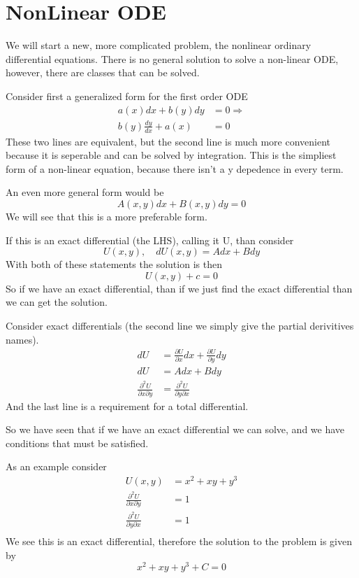 \documentclass{article}
\newcommand{\be}{\begin{equation}}
\newcommand{\ee}{\end{equation}}
\newcommand{\pd}{\partial}
\begin{document}
\section*{NonLinear ODE}
We will start a new, more complicated problem, the nonlinear ordinary differential equations. 
There is no general solution to solve a non-linear ODE, however, there are classes that can be solved. 

Consider first a generalized form for the first order ODE 
\be
\begin{split}
    a(x) dx + b(y) dy &= 0 \Rightarrow\\
    b(y) \frac{dy}{dx} + a(x) &= 0
\end{split}
\ee
These two lines are equivalent, but the second line is much more convenient because it is seperable and can be solved by integration. 
This is the simpliest form of a non-linear equation, because there isn't a y depedence in every term. 

An even more general form would be 
\be
A(x,y)dx + B(x,y)dy = 0
\ee
We will see that this is a more preferable form.

If this is an exact differential (the LHS), calling it U, than consider
\be
U(x,y), \quad dU(x,y) = Adx + Bdy
\ee
With both of these statements the solution is then
\be
U(x,y) + c = 0
\ee
So if we have an exact differential, than if we just find the exact differential than we can get the solution. 

Consider exact differentials (the second line we simply give the partial derivitives names). 
\be
\begin{split}
    dU &= \frac{\pd U}{\pd x} dx + \frac{\pd U}{\pd y} dy \\
    dU &= A dx + B dy \\
    \frac{\pd ^2 U}{\pd x \pd y} &= \frac{\pd ^2 U}{\pd y \pd x} 
\end{split}
\ee
And the last line is a requirement for a total differential.

So we have seen that if we have an exact differential we can solve, and we have conditions that must be satisfied. 

As an example consider
\be
\begin{split}
    U(x,y) &= x^2 + xy + y^3\\
    \frac{\pd ^2 U}{\pd x \pd y} &= 1\\
    \frac{\pd ^2 U}{\pd y \pd x} &= 1\\
\end{split}
\ee
We see this is an exact differential, therefore the solution to the problem is given  by
\be
x^2 + xy + y^3 + C = 0
\ee
\end{document}
